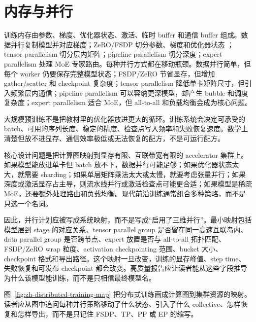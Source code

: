\documentclass[UTF8,zihao=-4,openany]{ctexbook}
\begin{document}
\section{内存与并行}
训练内存由参数、梯度、优化器状态、激活、临时 buffer 和通信 buffer 组成。数据并行复制模型并对应梯度；ZeRO/FSDP 切分参数、梯度和优化器状态 \cite{rajbhandari2020zero,zhao2023pytorchfsdp}；tensor parallelism 切分层内矩阵；pipeline parallelism 切分深度；expert parallelism 处理 MoE 专家路由。每种并行方式都在移动瓶颈。数据并行简单，但每个 worker 仍要保存完整模型状态；FSDP/ZeRO 节省显存，但增加 gather/scatter 和 checkpoint 复杂度；tensor parallelism 降低单卡矩阵尺寸，但引入频繁层内通信；pipeline parallelism 可以容纳更深模型，却产生 bubble 和调度复杂度；expert parallelism 适合 MoE，但 all-to-all 和负载均衡会成为核心问题。

大规模预训练不是把教材里的优化器放进更大的循环。训练系统会决定可承受的 batch、可用的序列长度、稳定的精度、检查点写入频率和失败恢复速度。数学上清楚但放不进显存、通信效率极低或无法恢复的配方，不是可运行配方。

核心设计问题是把计算图映射到显存有限、互联带宽有限的 accelerator 集群上。如果模型能放进单卡但 batch 放不下，数据并行可能足够；如果优化器状态太大，就需要 sharding；如果单层矩阵乘法太大或太慢，就要考虑张量并行；如果深度或激活显存占主导，则流水线并行或激活检查点可能更合适；如果模型是稀疏 MoE，还要额外处理路由和负载均衡。现代前沿训练通常组合多种策略，而不是只选一个名词。

因此，并行计划应被写成系统映射，而不是写成“启用了三维并行”。最小映射包括模型层到 stage 的对应关系、tensor parallel group 是否留在同一高速互联岛内、data parallel group 是否跨节点、expert 放置是否与 all-to-all 拓扑匹配、FSDP/ZeRO wrap 粒度、activation checkpointing 范围、bucket 大小、checkpoint 格式和导出路径。这个映射一旦改变，训练的显存峰值、step time、失败恢复和可发布 checkpoint 都会改变。高质量报告应让读者能从这些字段推导为什么该模型能训练，而不是只相信最终模型名。

图~\ref{fig:zh-distributed-training-map} 把分布式训练画成计算图到集群资源的映射。读者应从图中追问每种并行策略移动了什么状态、引入了什么 collective、怎样恢复和怎样导出，而不是只记住 FSDP、TP、PP 或 EP 的缩写。
\end{document}
